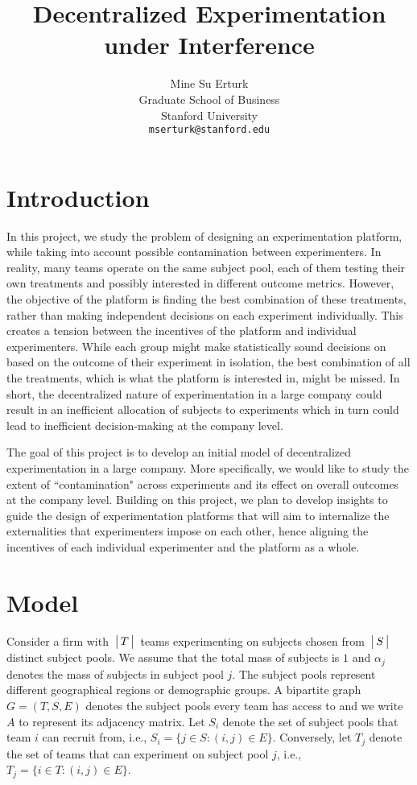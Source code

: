 \documentclass[12pt]{article}
\title{ Decentralized Experimentation under Interference }
\author{
Mine Su Erturk\\
Graduate School of Business\\
Stanford University\\
   \texttt{mserturk@stanford.edu} 
\iffalse  
  \and
Eray Turkel\\
Graduate School of Business\\
Stanford University\\
   \texttt{eturkel@stanford.edu} 
   \fi
}
\date{}
\begin{document}
\maketitle

\section{Introduction}
In this project, we study the problem of designing an experimentation platform, while taking into account possible contamination between experimenters. In reality, many teams operate on the same subject pool, each of them testing their own treatments and possibly interested in different outcome metrics. However, the objective of the platform is finding the best combination of these treatments, rather than making independent decisions on each experiment individually. This creates a tension between the incentives of the platform and individual experimenters. While each group might make statistically sound decisions on based on the outcome of their experiment in isolation, the best combination of all the treatments, which is what the platform is interested in, might be missed. In short, the decentralized nature of experimentation in a large company could result in an inefficient allocation of subjects to experiments which in turn could lead to inefficient decision-making at the company level.

The goal of this project is to develop an initial model of decentralized experimentation in a large company. More specifically, we would like to study the extent of ``contamination" across experiments and its effect on overall outcomes at the company level. Building on this project, we plan to develop insights to guide the design of experimentation platforms that will aim to internalize the externalities that experimenters impose on each other, hence aligning the incentives of each individual experimenter and the platform as a whole.

\section{Model}
Consider a firm with $\,\big{|}\, T \,\big{|}\,$ teams experimenting on subjects chosen from $\,\big{|}\, S \,\big{|}\,$ distinct subject pools. We assume that the total mass of subjects is $1$ and $\alpha_j$ denotes the mass of subjects in subject pool $j$. The subject pools represent different geographical regions or demographic groups. A bipartite graph $G=(T,S,E)$ denotes the subject pools every team has access to and we write $A$ to represent its adjacency matrix. Let $S_i$ denote the set of subject pools that team $i$ can recruit from, i.e., $S_i = \{ j \in S: (i,j) \in E \} $. Conversely, let $T_j$ denote the set of teams that can experiment on subject pool $j$, i.e., $T_j = \{ i \in T: (i,j) \in E \} $.
\end{document}
